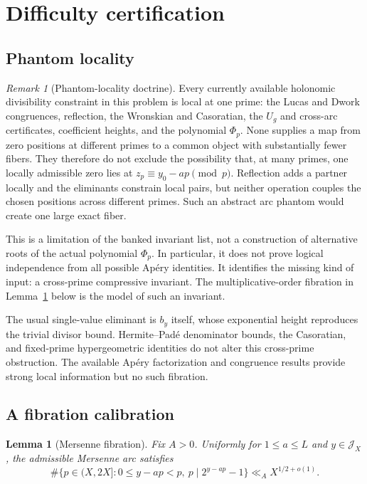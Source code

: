 \documentclass[11pt]{amsart}
\theoremstyle{plain}
\newtheorem{lemma}{Lemma}
\theoremstyle{remark}
\newtheorem{remark}{Remark}
\begin{document}
\section{Difficulty certification}\label{sec:difficulty}

\subsection{Phantom locality}

\begin{remark}[Phantom-locality doctrine]\label{rem:phantom-locality}
Every currently available holonomic divisibility constraint in this
problem is local at one prime: the Lucas and Dwork congruences,
reflection, the Wronskian and Casoratian, the $U_g$ and cross-arc
certificates, coefficient heights, and the polynomial $\Phi_p$.
None supplies a map from zero positions at different primes to a common
object with substantially fewer fibers.  They therefore do not exclude
the possibility that, at many primes, one locally admissible zero lies
at $z_p\equiv y_0-ap\pmod p$.  Reflection adds a partner locally and the
eliminants constrain local pairs, but neither operation couples the
chosen positions across different primes.  Such an abstract arc
phantom would create one large exact fiber.

This is a limitation of the banked invariant list, not a construction
of alternative roots of the actual polynomial $\Phi_p$.  In
particular, it does not prove logical independence from all possible
Ap\'ery identities.  It identifies the missing kind of input: a
cross-prime compressive invariant.  The multiplicative-order fibration
in Lemma~\ref{lem:Mersenne} below is the model of such an invariant.
\end{remark}

The usual single-value eliminant is $b_y$ itself, whose exponential
height reproduces the trivial divisor bound.  Hermite--Pad\'e
denominator bounds, the Casoratian, and fixed-prime hypergeometric
identities do not alter this cross-prime obstruction.  The available
Ap\'ery factorization and congruence results
\cite{CFVMZ2026,Delaygue2018,RowlandYassawiKrattenthaler2021}
provide strong local information but no such fibration.

\subsection{A fibration calibration}

\begin{lemma}[Mersenne fibration]\label{lem:Mersenne}
Fix $A>0$.  Uniformly for $1\leq a\leq L$ and
$y\in\mathcal J_X$, the admissible Mersenne arc satisfies
\[
 \#\{p\in(X,2X]:0\leq y-ap<p,\ p\mid2^{y-ap}-1\}
 \ll_A X^{1/2+o(1)}.
 \tag{8.1}\label{eq:Mersenne}
\]
\end{lemma}
\end{document}
